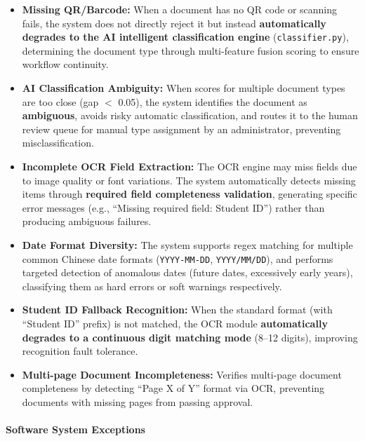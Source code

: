 \documentclass[conference]{IEEEtran}
\begin{document}
\begin{itemize}[leftmargin=*]
    \item \textbf{Missing QR/Barcode:} When a document has no QR code or scanning fails, the system does not directly reject it but instead \textbf{automatically degrades to the AI intelligent classification engine} (\texttt{classifier.py}), determining the document type through multi-feature fusion scoring to ensure workflow continuity.
    \item \textbf{AI Classification Ambiguity:} When scores for multiple document types are too close (gap $<$ 0.05), the system identifies the document as \textbf{ambiguous}, avoids risky automatic classification, and routes it to the human review queue for manual type assignment by an administrator, preventing misclassification.
    \item \textbf{Incomplete OCR Field Extraction:} The OCR engine may miss fields due to image quality or font variations. The system automatically detects missing items through \textbf{required field completeness validation}, generating specific error messages (e.g., ``Missing required field: Student ID'') rather than producing ambiguous failures.
    \item \textbf{Date Format Diversity:} The system supports regex matching for multiple common Chinese date formats (\texttt{YYYY-MM-DD}, \texttt{YYYY/MM/DD}), and performs targeted detection of anomalous dates (future dates, excessively early years), classifying them as hard errors or soft warnings respectively.
    \item \textbf{Student ID Fallback Recognition:} When the standard format (with ``Student ID'' prefix) is not matched, the OCR module \textbf{automatically degrades to a continuous digit matching mode} (8--12 digits), improving recognition fault tolerance.
    \item \textbf{Multi-page Document Incompleteness:} Verifies multi-page document completeness by detecting ``Page X of Y'' format via OCR, preventing documents with missing pages from passing approval.
\end{itemize}

\paragraph{Software System Exceptions}
\end{document}
